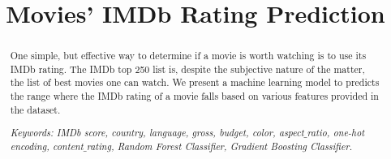 \documentclass[conference]{IEEEtran}
\begin{document}
\title{Movies' IMDb Rating Prediction}
\author{
\and
{}
\and
{}
}
\maketitle
\begin{abstract}
One simple, but effective way to determine if a movie is worth watching is to use its IMDb rating. The IMDb top 250 list is, despite the subjective nature of the matter, the list of best movies one can watch. We present a machine learning model to predicts the range where the IMDb rating of a movie falls based on various features provided in the dataset.

\textit{Keywords: IMDb score, country, language, gross, budget, color, aspect$\_$ratio, one-hot encoding, content$\_$rating, Random Forest Classifier, Gradient Boosting Classifier.}
\end{abstract}
\end{document}
